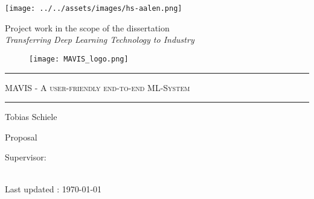 




\begin{titlepage}
%
    \texttt{[image: ../../assets/images/hs-aalen.png]}
    \vskip 2cm
%
    \begin{flushleft}
        \par \color{darkgray} %
        Project work in the scope of the dissertation \\%
        \textit{Transferring Deep Learning Technology to Industry}
    \end{flushleft}
    \vfill
%
    \begin{center}

        \vspace{0mm}
        \begin{figure}[!h]
            \centering
            \texttt{[image: MAVIS\_logo.png]}
        \end{figure}

        \par \rule{\textwidth}{0.2pt}
        \par\Huge\textsc{MAVIS - A user-friendly end-to-end ML-System}%
        \par\rule[1ex]{\textwidth}{0.2pt}
        \par \large \color{black}%
        \large Tobias Schiele %

    \end{center}
    \vfill
%
    \begin{flushright}\begin{minipage}{0.45\linewidth}
        \par\Large \color{black}
        \par\large Proposal\\
        \par\large Supervisor: \\ \large \\
        \par
    \end{minipage}\end{flushright}
    \vfill
%
    \begin{center}
        \color{black}
        \vspace*{0mm}
        \small  Last updated : \MonthYearFormat\today
    \end{center}
%
\end{titlepage}



